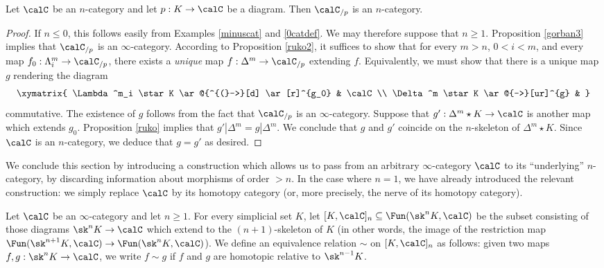\begin{corollary}\label{ncatsliceee}
Let $\calC$ be an $n$-category and let $p: K \rightarrow \calC$ be a diagram.
Then $\calC_{/p}$ is an $n$-category.
\end{corollary}

\begin{proof}
If $n \leq 0$, this follows easily from Examples \ref{minuscat} and \ref{0catdef}. We may therefore suppose that $n \geq 1$. Proposition \ref{gorban3} implies that $\calC_{/p}$ is an $\infty$-category.
According to Proposition \ref{ruko2}, it suffices to show that for every
$m > n$, $0 < i < m$, and every map $f_0: \Lambda^m_i \rightarrow \calC_{/p}$, there
exists a {\em unique} map $f: \Delta^m \rightarrow \calC_{/p}$ extending $f$.
Equivalently, we must show that there is a unique map $g$ rendering the diagram
$$ \xymatrix{ \Lambda^m_i \star K \ar@{^{(}->}[d] \ar[r]^{g_0} & \calC \\
\Delta^m \star K \ar@{-->}[ur]^{g} & }$$
commutative. The existence of $g$ follows from the fact that $\calC_{/p}$ is an $\infty$-category.
Suppose that $g': \Delta^m \star K \rightarrow \calC$ is another map which extends $g_0$.
Proposition \ref{ruko} implies that $g' | \Delta^m = g | \Delta^m$. We conclude that
$g$ and $g'$ coincide on the $n$-skeleton of $\Delta^m \star K$. Since $\calC$ is an $n$-category, we deduce that $g = g'$ as desired.
\end{proof}

We conclude this section by introducing a construction which allows us to pass from an arbitrary $\infty$-category $\calC$ to its ``underlying'' $n$-category, by discarding information about morphisms of order $> n$. In the case where $n=1$, we have already introduced the relevant construction: we simply replace $\calC$ by its homotopy category (or, more precisely, the nerve of its homotopy category).

\begin{notation}
Let $\calC$ be an $\infty$-category and let $n \geq 1$. 
For every simplicial set $K$, let $[ K, \calC ]_{n} \subseteq \Fun( \sk^{n} K, \calC )$
be the subset consisting of those diagrams $\sk^n K \rightarrow \calC$ which extend
to the $(n+1)$-skeleton of $K$ (in other words, the image of the restriction map
$\Fun( \sk^{n+1} K, \calC) \rightarrow \Fun( \sk^n K, \calC)$). 
We define an equivalence relation $\sim$ on $[K, \calC]_{n}$ as follows: given two 
maps $f,g: \sk^n K \rightarrow \calC$, we write $f \sim g$ if $f$ and $g$ are homotopic
relative to $\sk^{n-1} K$.
\end{notation}


